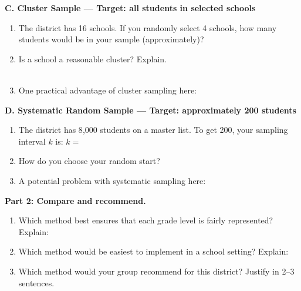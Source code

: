 \documentclass[10pt]{article}
\begin{document}
\vspace{0.1in}

\begin{practicebox}
\small
\textbf{C. Cluster Sample --- Target: all students in selected schools}

\begin{enumerate}[leftmargin=1.5em, itemsep=6pt]
  \item The district has 16 schools. If you randomly select 4 schools, how many
        students would be in your sample (approximately)? \blank{4cm}
  \item Is a school a reasonable cluster? Explain.\\
        \writeline\\[1pt]\writeline
  \item One practical advantage of cluster sampling here: \blank{9cm}
\end{enumerate}
\end{practicebox}

\vspace{0.1in}

\begin{practicebox}
\small
\textbf{D. Systematic Random Sample --- Target: approximately 200 students}

\begin{enumerate}[leftmargin=1.5em, itemsep=6pt]
  \item The district has 8{,}000 students on a master list. To get 200, your sampling
        interval $k$ is: $k = $ \blank{2cm}
  \item How do you choose your random start? \blank{9cm}
  \item A potential problem with systematic sampling here: \blank{9cm}
\end{enumerate}
\end{practicebox}

\vspace{0.1in}

\textbf{Part 2: Compare and recommend.}

\begin{practicebox}
\small
\begin{enumerate}[leftmargin=1.5em, itemsep=8pt]
  \item Which method best ensures that each grade level is fairly represented?
        \blank{4cm} \quad Explain: \blank{7cm}
  \item Which method would be easiest to implement in a school setting?
        \blank{4cm} \quad Explain: \blank{7cm}
  \item Which method would your group recommend for this district? Justify in 2--3
        sentences.\\
        \writeline\\[1pt]\writeline\\[1pt]\writeline
\end{enumerate}
\end{practicebox}
\end{document}

